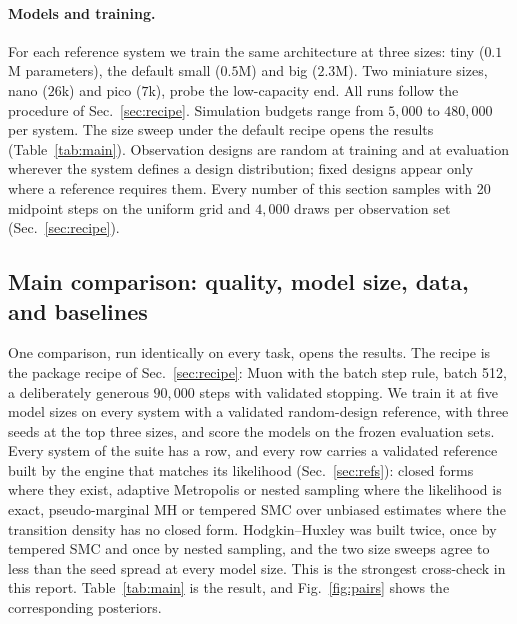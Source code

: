\documentclass[10pt]{article}
\begin{document}
\paragraph{Models and training.} For each reference system we train the same architecture at three
sizes: tiny ($0.1$M parameters), the default small ($0.5$M) and big ($2.3$M). Two miniature sizes,
nano ($26$k) and pico ($7$k), probe the low-capacity end. All runs follow the procedure of
Sec.~\ref{sec:recipe}. Simulation budgets range from $5{,}000$ to $480{,}000$ per system. The size
sweep under the default recipe opens the results (Table~\ref{tab:main}). Observation designs are
random at training and at evaluation wherever the system defines a design distribution; fixed designs
appear only where a reference requires them. Every number of this section samples with 20 midpoint
steps on the uniform grid and $4{,}000$ draws per observation set (Sec.~\ref{sec:recipe}).

\subsection{Main comparison: quality, model size, data, and baselines}
\label{sec:summary}
\label{sec:gallery}
\label{sec:pairs}
\label{sec:maincomp}

One comparison, run identically on every task, opens the results. The recipe is the package recipe of
Sec.~\ref{sec:recipe}: Muon with the batch step rule, batch 512, a deliberately generous $90{,}000$
steps with validated stopping. We train it at five model sizes on every system with a validated
random-design reference, with three seeds at the top three sizes, and score the models on the frozen
evaluation sets. Every system of the suite has a row, and every row carries a validated reference
built by the engine that matches its likelihood (Sec.~\ref{sec:refs}): closed forms where they exist,
adaptive Metropolis or nested sampling where the likelihood is exact, pseudo-marginal MH or tempered
SMC over unbiased estimates where the transition density has no closed form. Hodgkin--Huxley was
built twice, once by tempered SMC and once by nested sampling, and the two size sweeps agree to less
than the seed spread at every model size. This is the strongest cross-check in this report.
Table~\ref{tab:main} is the result, and Fig.~\ref{fig:pairs} shows the corresponding posteriors.
\end{document}
